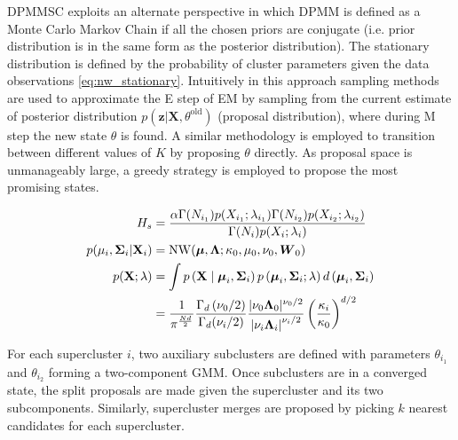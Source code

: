 \begin{secDefinition}
DPMMSC exploits an alternate perspective in which DPMM is defined as a Monte Carlo Markov Chain if all the chosen priors are conjugate (i.e. prior distribution is in the same form as the posterior distribution).
The stationary distribution is defined by the probability of cluster parameters given the data observations \cref{eq:nw_stationary}.
Intuitively in this approach sampling methods are used to approximate the E step of EM by sampling from the current estimate of posterior distribution $p(\mathbf{z}|\mathbf{X}, \theta^{\text{old}})$ (proposal distribution), where during M step the new state $\theta$ is found.
A similar methodology is employed to transition between different values of $K$ by proposing $\theta$ directly.
As proposal space is unmanageably large, a greedy strategy is employed to propose the most promising states.

\begin{align}
    H_s &= \frac{
    \alpha \Gamma (N_{i_1}) p(X_{i_1}; \lambda_{i_1}) \Gamma (N_{i_2}) p(X_{i_2}; \lambda_{i_2})}{
    \Gamma (N_i) p(X_{i}; \lambda_i)} \label{eq:hastings_sratio}\\
    p(\mu_i, \boldsymbol{\Sigma}_i | \mathbf{X}_i) &= \operatorname{NW}(\boldsymbol{\mu}, \boldsymbol{\Lambda}; \kappa_0, \mu_0, \nu_0, \boldsymbol{W}_0) \label{eq:nw_stationary} \\
    p(\mathbf{X}; \lambda) &= \int p\left(\mathbf{X} \mid \boldsymbol{\mu}_{i}, \boldsymbol{\Sigma}_{i}\right) p\left(\boldsymbol{\mu}_{i}, \boldsymbol{\Sigma}_{i} ; \lambda\right) d\left(\boldsymbol{\mu}_{i}, \boldsymbol{\Sigma}_{i}\right) \notag \\
    &=\frac{1}{\pi^{\frac{N d}{2}}} 
    \frac{\Gamma_{d}\left(\nu_0 / 2\right)}{\Gamma_{d}(\nu_i / 2)} 
    \frac{|\nu_0 \boldsymbol{\Lambda}_0|^{\nu_0 / 2}}{\left|\nu_i \boldsymbol{\Lambda}_{i}\right|^{\nu_i / 2}}\left(\frac{\kappa_i}{\kappa_0}\right)^{d / 2} \label{eq:data_prob}
\end{align}

For each supercluster $i$, two auxiliary subclusters are defined with parameters $\theta_{i_1}$ and $\theta_{i_2}$ forming a two-component GMM.
Once subclusters are in a converged state, the split proposals are made given the supercluster and its two subcomponents.
Similarly, supercluster merges are proposed by picking $k$ nearest candidates for each supercluster.


\end{secDefinition}
